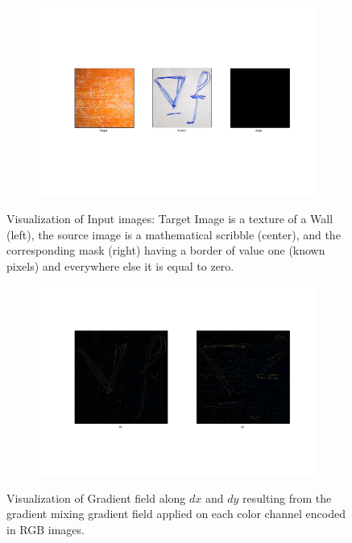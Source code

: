 \documentclass{paper}
\begin{document}
\begin{figure}[H]
    \centering
    \begin{subfigure}{1.0\textwidth}
        \includegraphics[width=\textwidth]{../../outputs/p4/gradient_mixing/input}
    \end{subfigure}
    \caption{Visualization of Input images: Target Image is a texture of a Wall (left), the source image is a mathematical scribble (center), and the corresponding mask (right) having a border of value one (known pixels) and everywhere else it is equal to zero.}
    \label{fig:gradient_mixing_input}       
\end{figure}


\begin{figure}[H]
    \centering
    \begin{subfigure}{1.0\textwidth}
        \includegraphics[width=\textwidth]{../../outputs/p4/gradient_mixing/gradients}
    \end{subfigure}
    \caption{Visualization of Gradient field along $dx$ and $dy$ resulting from the gradient mixing gradient field applied on each color channel encoded in RGB images.}
    \label{fig:gradient_mixing_gradients}       
\end{figure}
\end{document}
